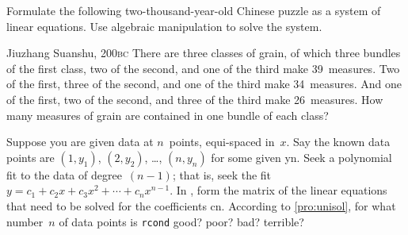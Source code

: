 \begin{exercise}  
Formulate the following two-thousand-year-old Chinese puzzle as a system of linear equations.
Use algebraic manipulation to solve the system.
\begin{quoted}{Jiuzhang Suanshu, 200\textsc{bc} \cite[p.3]{Chartier2015}}
There are three classes of grain, of which three bundles of the first class, two of the second, and one of the third make 39~measures.
Two of the first, three of the second, and one of the third make 34~measures.
And one of the first, two of the second, and three of the third make 26~measures.
How many measures of grain are contained in one bundle of each class?
\end{quoted}
\end{exercise}



\begin{comment}
Could have project exercises to introduce sensitivity to small errors in applications (experimental computational maths).  
Although sensitivity is quantified in the section on condition number and rank.
\end{comment}





\begin{exercise}  
Suppose you are given data at \(n\)~points, equi-spaced in~\(x\).
Say the known data points are \((1,y_1)\), \((2,y_2)\), \ldots, \((n,y_n)\) for some given \hlist yn.
Seek a polynomial fit to the data of degree~\((n-1)\); that is, seek the fit \(y=c_1+c_2x+c_3x^2+\cdots+c_{n}x^{n-1}\).
In \script, form the matrix of the linear equations that need to be solved for the coefficients \hlist cn.  
According to \cref{pro:unisol}, for what number~\(n\) of data points is \verb|rcond| good? poor? bad? terrible? 
\end{exercise}




